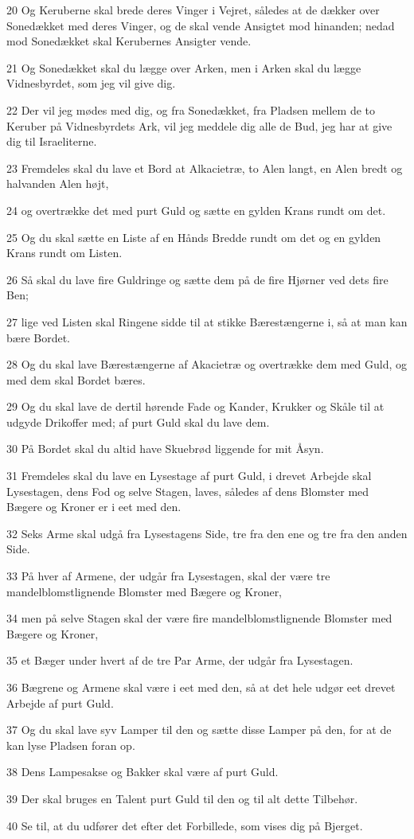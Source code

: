 \par 20 Og Keruberne skal brede deres Vinger i Vejret, således at de dækker over Sonedækket med deres Vinger, og de skal vende Ansigtet mod hinanden; nedad mod Sonedækket skal Kerubernes Ansigter vende.
\par 21 Og Sonedækket skal du lægge over Arken, men i Arken skal du lægge Vidnesbyrdet, som jeg vil give dig.
\par 22 Der vil jeg mødes med dig, og fra Sonedækket, fra Pladsen mellem de to Keruber på Vidnesbyrdets Ark, vil jeg meddele dig alle de Bud, jeg har at give dig til Israeliterne.
\par 23 Fremdeles skal du lave et Bord at Alkacietræ, to Alen langt, en Alen bredt og halvanden Alen højt,
\par 24 og overtrække det med purt Guld og sætte en gylden Krans rundt om det.
\par 25 Og du skal sætte en Liste af en Hånds Bredde rundt om det og en gylden Krans rundt om Listen.
\par 26 Så skal du lave fire Guldringe og sætte dem på de fire Hjørner ved dets fire Ben;
\par 27 lige ved Listen skal Ringene sidde til at stikke Bærestængerne i, så at man kan bære Bordet.
\par 28 Og du skal lave Bærestængerne af Akacietræ og overtrække dem med Guld, og med dem skal Bordet bæres.
\par 29 Og du skal lave de dertil hørende Fade og Kander, Krukker og Skåle til at udgyde Drikoffer med; af purt Guld skal du lave dem.
\par 30 På Bordet skal du altid have Skuebrød liggende for mit Åsyn.
\par 31 Fremdeles skal du lave en Lysestage af purt Guld, i drevet Arbejde skal Lysestagen, dens Fod og selve Stagen, laves, således af dens Blomster med Bægere og Kroner er i eet med den.
\par 32 Seks Arme skal udgå fra Lysestagens Side, tre fra den ene og tre fra den anden Side.
\par 33 På hver af Armene, der udgår fra Lysestagen, skal der være tre mandelblomstlignende Blomster med Bægere og Kroner,
\par 34 men på selve Stagen skal der være fire mandelblomstlignende Blomster med Bægere og Kroner,
\par 35 et Bæger under hvert af de tre Par Arme, der udgår fra Lysestagen.
\par 36 Bægrene og Armene skal være i eet med den, så at det hele udgør eet drevet Arbejde af purt Guld.
\par 37 Og du skal lave syv Lamper til den og sætte disse Lamper på den, for at de kan lyse Pladsen foran op.
\par 38 Dens Lampesakse og Bakker skal være af purt Guld.
\par 39 Der skal bruges en Talent purt Guld til den og til alt dette Tilbehør.
\par 40 Se til, at du udfører det efter det Forbillede, som vises dig på Bjerget.

